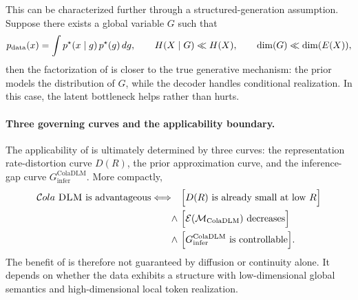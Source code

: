 This can be characterized further through a structured-generation assumption. Suppose there exists a global variable \(G\) such that
\begin{equation}
p_{\mathrm{data}}(x)=\int p^\star(x\mid g)\,p^\star(g)\,dg,
\qquad
H(X\mid G)\ll H(X),
\qquad
\dim(G)\ll \dim(E(X)),
\label{eq:main_structured_generation}
\end{equation}
then the factorization of \method is closer to the true generative mechanism: the prior models the distribution of \(G\), while the decoder handles conditional realization. In this case, the latent bottleneck helps rather than hurts.

\paragraph{\textbf{Three governing curves and the applicability boundary.}}
The applicability of \method is ultimately determined by three curves: the representation rate-distortion curve \(D(R)\), the prior approximation curve, and the inference-gap curve \(G_{\mathrm{infer}}^{\mathrm{ColaDLM}}\). More compactly,
\begin{equation}
\begin{aligned}
    \text{\method is advantageous} \Longleftrightarrow \quad
    & \Bigl[D(R)\ \text{is already small at low }R\Bigr] \\
    \wedge\ & \Bigl[\mathcal E(\mathcal M_{\mathrm{ColaDLM}})\ \text{decreases}\Bigr] \\
    \wedge\ & \Bigl[G_{\mathrm{infer}}^{\mathrm{ColaDLM}}\ \text{is controllable}\Bigr].
\end{aligned}
\label{eq:main_three_curves}
\end{equation}
The benefit of \method is therefore not guaranteed by diffusion or continuity alone. It depends on whether the data exhibits a structure with low-dimensional global semantics and high-dimensional local token realization.

